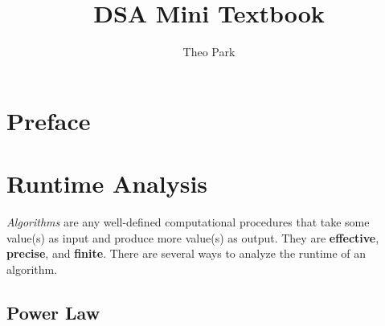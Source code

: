 \documentclass{report}
\title{DSA Mini Textbook}
\author{Theo Park}
\date{}
\begin{document}
\maketitle

\pagestyle{fancy}

\tableofcontents

\chapter*{Preface}


\chapter{Runtime Analysis}

\textit{Algorithms} are any well-defined computational procedures that take some value(s) as input and produce more value(s) as output. They are \textbf{effective}, \textbf{precise}, and \textbf{finite}. There are several ways to analyze the runtime of an algorithm.

\section{Power Law}
\end{document}
